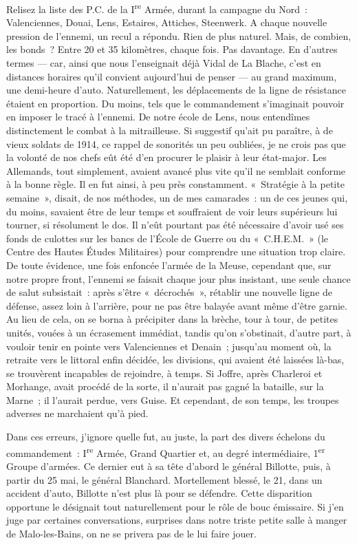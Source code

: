 \documentclass[french,twoside]{book} %
\begin{document}
Relisez la liste des P.C. de la I\textsuperscript{re} Armée, durant la campagne du Nord : Valenciennes, Douai, Lens, Estaires, Attiches, Steenwerk. A chaque nouvelle pression de l’ennemi, un recul a répondu. Rien de plus naturel. Mais, de combien, les bonds ? Entre 20 et 35 kilomètres, chaque fois. Pas davantage. En d’autres termes — car, ainsi que nous l’enseignait déjà Vidal de La Blache, c’est en distances horaires qu’il convient aujourd’hui de penser — au grand maximum, une demi-heure d’auto. Naturellement, les déplacements de la ligne de résistance étaient en proportion. Du moins, tels que le commandement s’imaginait pouvoir en imposer le tracé à l’ennemi. De notre école de Lens, nous entendîmes distinctement le combat à la mitrailleuse. Si suggestif qu’ait pu paraître, à de vieux soldats de 1914, ce rappel de sonorités un peu oubliées, je ne crois pas que la volonté de nos chefs eût été d’en procurer le plaisir à leur état-major. Les Allemands, tout simplement, avaient avancé plus vite qu’il ne semblait conforme à la bonne règle. Il en fut ainsi, à peu près constamment. « Stratégie à la petite semaine », disait, de nos méthodes, un de mes camarades : un de ces jeunes qui, du moins, savaient être de leur temps et souffraient de voir leurs supérieurs lui tourner, si résolument le dos. Il n’eût pourtant pas été nécessaire d’avoir usé ses fonds de culottes sur les bancs de l’École de Guerre ou du « C.H.E.M. » (le Centre   des Hautes Études Militaires) pour comprendre une situation trop claire. De toute évidence, une fois enfoncée l’armée de la Meuse, cependant que, sur notre propre front, l’ennemi se faisait chaque jour plus insistant, une seule chance de salut subsistait : après s’être « décrochés », rétablir une nouvelle ligne de défense, assez loin à l’arrière, pour ne pas être balayée avant même d’être garnie. Au lieu de cela, on se borna à précipiter dans la brèche, tour à tour, de petites unités, vouées à un écrasement immédiat, tandis qu’on s’obstinait, d’autre part, à vouloir tenir en pointe vers Valenciennes et Denain ; jusqu’au moment où, la retraite vers le littoral enfin décidée, les divisions, qui avaient été laissées là-bas, se trouvèrent incapables de rejoindre, à temps. Si Joffre, après Charleroi et Morhange, avait procédé de la sorte, il n’aurait pas gagné la bataille, sur la Marne ; il l’aurait perdue, vers Guise. Et cependant, de son temps, les troupes adverses ne marchaient qu’à pied.\par
Dans ces erreurs, j’ignore quelle fut, au juste, la part des divers échelons du commandement : I\textsuperscript{re} Armée, Grand Quartier et, au degré intermédiaire, 1\textsuperscript{er} Groupe d’armées. Ce dernier eut à sa tête d’abord le général Billotte, puis, à partir du 25 mai, le général Blanchard. Mortellement blessé, le 21, dans un accident d’auto, Billotte n’est plus là pour se défendre. Cette disparition opportune le désignait tout naturellement pour le rôle de bouc émissaire. Si j’en juge par certaines conversations, surprises dans notre triste petite salle à manger de Malo-les-Bains, on ne se privera pas de le lui faire jouer.\par
\end{document}
